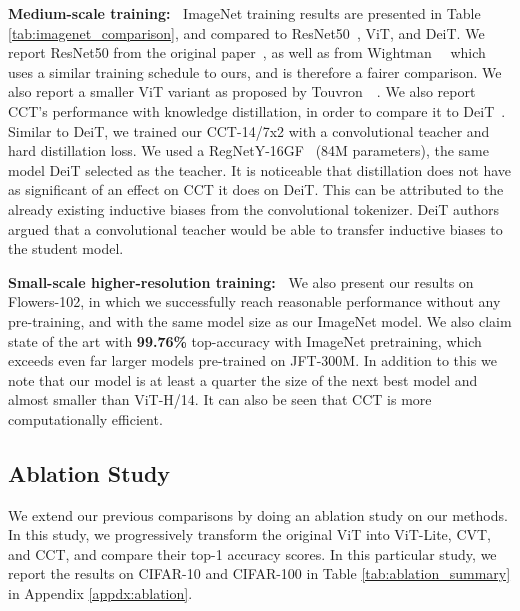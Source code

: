 \documentclass[10pt,twocolumn,letterpaper]{article}
\begin{document}
\textbf{Medium-scale training:~} ImageNet training results are presented in Table \ref{tab:imagenet_comparison}, and compared to ResNet50~\cite{he2016deep}, ViT, and DeiT. We report ResNet50 from the original paper~\cite{he2016deep}, as well as from Wightman~\etal~\cite{wightman2021resnet} which uses a similar training schedule to ours, and is therefore a fairer comparison. We also report a smaller ViT variant as proposed by Touvron~\etal~\cite{touvron2020training}. We also report CCT's performance with knowledge distillation, in order to compare it to DeiT~\cite{touvron2020training}. Similar to DeiT, we trained our CCT-14/7x2 with a convolutional teacher and hard distillation loss. We used a RegNetY-16GF~\cite{radosavovic2020designing} (84M parameters), the same model DeiT selected as the teacher. It is noticeable that distillation does not have as significant of an effect on CCT it does on DeiT. This can be attributed to the already existing inductive biases from the convolutional tokenizer. DeiT authors argued that a convolutional teacher would be able to transfer inductive biases to the student model.

\textbf{Small-scale higher-resolution training:~} We also present our results on Flowers-102, in which we successfully reach reasonable performance without any pre-training, and with the same model size as our ImageNet model. We also claim state of the art with \textbf{99.76\%} top-accuracy with ImageNet pretraining, which exceeds even far larger models pre-trained on JFT-300M.
In addition to this we note that our model is at least a quarter the size of the next best model and almost  smaller than ViT-H/14. It can also be seen that CCT is  more computationally efficient.

\subsection{Ablation Study}
\label{sec:ablation}
We extend our previous comparisons by doing an ablation study on our methods.
In this study, we progressively transform the original ViT into ViT-Lite, CVT, and CCT, and compare their top-1 accuracy scores. In this particular study, we report the results on CIFAR-10 and CIFAR-100 in Table \ref{tab:ablation_summary} in Appendix \ref{appdx:ablation}.
\end{document}
